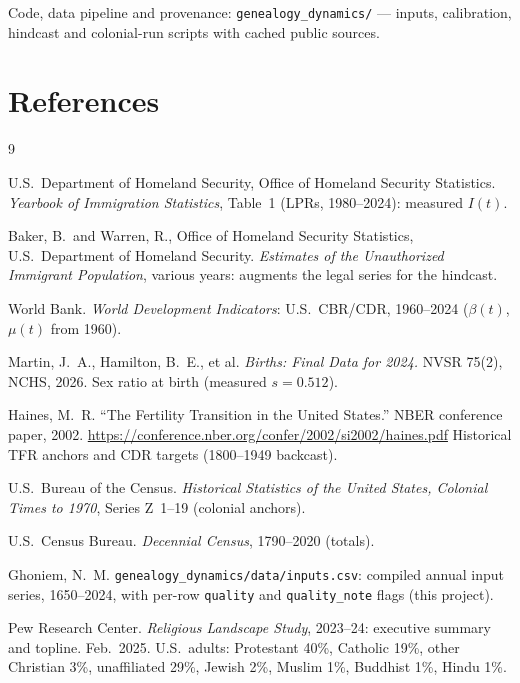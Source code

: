 \documentclass[11pt,a4paper]{article}
\begin{document}
\vspace{0.3cm}
\begin{center}
\textcolor{nmgray}{\small Code, data pipeline and provenance:
\texttt{genealogy\_dynamics/} --- inputs, calibration, hindcast and
colonial-run scripts with cached public sources.}
\end{center}

\section{References}
\vspace{-1.4em}
\renewcommand{\refname}{}
{\small
\begin{thebibliography}{9}

U.S.\ Department of Homeland Security, Office of Homeland Security
Statistics. \textit{Yearbook of Immigration Statistics}, Table~1 (LPRs,
1980--2024): measured $I(t)$.

Baker, B.\ and Warren, R., Office of Homeland Security Statistics, U.S.\
Department of Homeland Security. \textit{Estimates of the Unauthorized
Immigrant Population}, various years: augments the legal series for the
hindcast.

World Bank. \textit{World Development Indicators}: U.S.\ CBR/CDR,
1960--2024 ($\beta(t)$, $\mu(t)$ from 1960).

Martin, J.~A., Hamilton, B.~E., et al. \textit{Births: Final Data for
2024.} NVSR 75(2), NCHS, 2026.  Sex ratio at birth (measured
$s=0.512$).

Haines, M.~R. ``The Fertility Transition in the United States.''
NBER conference paper, 2002.
\url{https://conference.nber.org/confer/2002/si2002/haines.pdf}
Historical TFR anchors and CDR targets (1800--1949 backcast).

U.S.\ Bureau of the Census. \textit{Historical Statistics of the United
States, Colonial Times to 1970}, Series Z~1--19 (colonial anchors).

U.S.\ Census Bureau. \textit{Decennial Census}, 1790--2020 (totals).

Ghoniem, N.~M. \texttt{genealogy\_dynamics/data/inputs.csv}: compiled annual
input series, 1650--2024, with per-row \texttt{quality} and
\texttt{quality\_note} flags (this project).

Pew Research Center. \textit{Religious Landscape Study}, 2023--24:
executive summary and topline.  Feb.\ 2025.  U.S.\ adults: Protestant
40\%, Catholic 19\%, other Christian 3\%, unaffiliated 29\%, Jewish 2\%,
Muslim 1\%, Buddhist 1\%, Hindu 1\%.


\end{thebibliography}}
\end{document}
